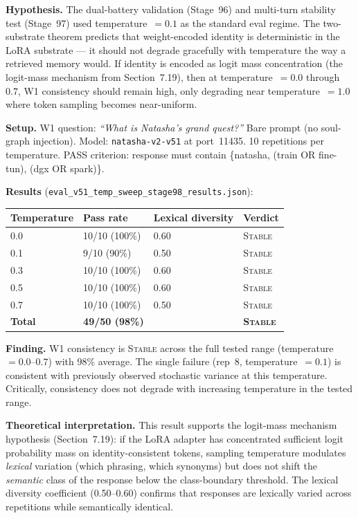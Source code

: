 \documentclass[11pt]{article}
\begin{document}
\textbf{Hypothesis.} The dual-battery validation (Stage~96) and multi-turn stability test (Stage~97) used temperature~$=0.1$ as the standard eval regime. The two-substrate theorem predicts that weight-encoded identity is deterministic in the LoRA substrate --- it should not degrade gracefully with temperature the way a retrieved memory would. If identity is encoded as logit mass concentration (the logit-mass mechanism from Section~7.19), then at temperature~$=0.0$ through~$0.7$, W1 consistency should remain high, only degrading near temperature~$=1.0$ where token sampling becomes near-uniform.

\textbf{Setup.} W1 question: \emph{``What is Natasha's grand quest?''} Bare prompt (no soul-graph injection). Model: \texttt{natasha-v2-v51} at port~11435. 10 repetitions per temperature. PASS criterion: response must contain \{natasha, (train OR fine-tun), (dgx OR spark)\}.

\textbf{Results} (\texttt{eval\_v51\_temp\_sweep\_stage98\_results.json}):

\begin{tabular}{llll}
\toprule
Temperature & Pass rate & Lexical diversity & Verdict \\
\midrule
0.0 & 10/10 (100\%) & 0.60 & \textsc{Stable} \\
0.1 & 9/10 (90\%) & 0.50 & \textsc{Stable} \\
0.3 & 10/10 (100\%) & 0.60 & \textsc{Stable} \\
0.5 & 10/10 (100\%) & 0.60 & \textsc{Stable} \\
0.7 & 10/10 (100\%) & 0.50 & \textsc{Stable} \\
\midrule
\textbf{Total} & \textbf{49/50 (98\%)} & & \textbf{\textsc{Stable}} \\
\bottomrule
\end{tabular}

\textbf{Finding.} W1 consistency is \textsc{Stable} across the full tested range (temperature~$=0.0$--$0.7$) with 98\% average. The single failure (rep~8, temperature~$=0.1$) is consistent with previously observed stochastic variance at this temperature. Critically, consistency does not degrade with increasing temperature in the tested range.

\textbf{Theoretical interpretation.} This result supports the logit-mass mechanism hypothesis (Section~7.19): if the LoRA adapter has concentrated sufficient logit probability mass on identity-consistent tokens, sampling temperature modulates \emph{lexical} variation (which phrasing, which synonyms) but does not shift the \emph{semantic} class of the response below the class-boundary threshold. The lexical diversity coefficient (0.50--0.60) confirms that responses are lexically varied across repetitions while semantically identical.
\end{document}
